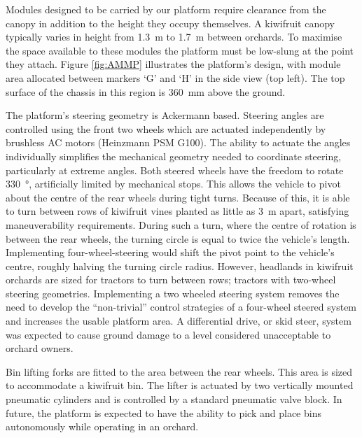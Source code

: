 \documentclass[preprint,authoryear,12pt]{elsarticle}
\begin{document}
        Modules designed to be carried by our platform require clearance from the canopy in addition to the height they occupy themselves.
        A kiwifruit canopy typically varies in height from \SI{1.3}{\meter} to \SI{1.7}{\meter} between orchards.
        To maximise the space available to these modules the platform must be low-slung at the point they attach.
        Figure \ref{fig:AMMP} illustrates the platform's design, with module area allocated between markers `G' and `H' in the side view (top left).
        The top surface of the chassis in this region is \SI{360}{\milli\meter} above the ground.

        The platform's steering geometry is Ackermann based.
        Steering angles are controlled using the front two wheels which are actuated independently by brushless AC motors (Heinzmann PSM G100).
        The ability to actuate the angles individually simplifies the mechanical geometry needed to coordinate steering, particularly at extreme angles.
        Both steered wheels have the freedom to rotate \SI{330}{\degree}, artificially limited by mechanical stops.
        This allows the vehicle to pivot about the centre of the rear wheels during tight turns.
        Because of this, it is able to turn between rows of kiwifruit vines planted as little as \SI{3}{\meter} apart, satisfying maneuverability requirements.
        During such a turn, where the centre of rotation is between the rear wheels, the turning circle is equal to twice the vehicle's length.
        Implementing four-wheel-steering would shift the pivot point to the vehicle's centre, roughly halving the turning circle radius.
        However, headlands in kiwifruit orchards are sized for tractors to turn between rows; tractors with two-wheel steering geometries.
        Implementing a two wheeled steering system removes the need to develop the ``non-trivial'' control strategies of a four-wheel steered system and increases the usable platform area.
        A differential drive, or skid steer, system was expected to cause ground damage to a level considered unacceptable to orchard owners.

        Bin lifting forks are fitted to the area between the rear wheels.
        This area is sized to accommodate a kiwifruit bin.
        The lifter is actuated by two vertically mounted pneumatic cylinders and is controlled by a standard pneumatic valve block.
        In future, the platform is expected to have the ability to pick and place bins autonomously while operating in an orchard.
\end{document}
